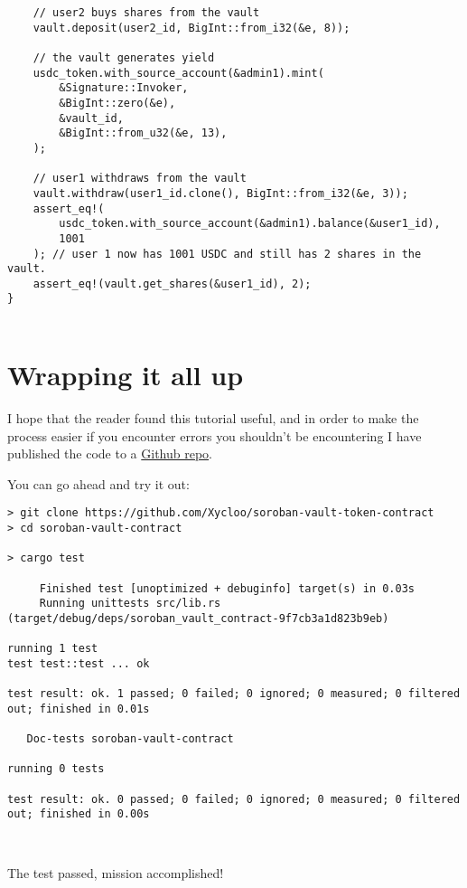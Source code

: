 \documentclass{article}
\begin{document}
\begin{lstlisting}
    // user2 buys shares from the vault
    vault.deposit(user2_id, BigInt::from_i32(&e, 8));

    // the vault generates yield
    usdc_token.with_source_account(&admin1).mint(
        &Signature::Invoker,
        &BigInt::zero(&e),
        &vault_id,
        &BigInt::from_u32(&e, 13),
    );

    // user1 withdraws from the vault
    vault.withdraw(user1_id.clone(), BigInt::from_i32(&e, 3));
    assert_eq!(
        usdc_token.with_source_account(&admin1).balance(&user1_id),
        1001
    ); // user 1 now has 1001 USDC and still has 2 shares in the vault.
    assert_eq!(vault.get_shares(&user1_id), 2);
}


\end{lstlisting}

\section{Wrapping it all up}
I hope that the reader found this tutorial useful, and in order to make the process easier if you encounter errors you shouldn't be encountering I have published the code to a \href{https://github.com/Xycloo/soroban-vault-contract}{Github repo}.

You can go ahead and try it out:

\begin{lstlisting}
> git clone https://github.com/Xycloo/soroban-vault-token-contract
> cd soroban-vault-contract

> cargo test

     Finished test [unoptimized + debuginfo] target(s) in 0.03s
     Running unittests src/lib.rs (target/debug/deps/soroban_vault_contract-9f7cb3a1d823b9eb)

running 1 test
test test::test ... ok

test result: ok. 1 passed; 0 failed; 0 ignored; 0 measured; 0 filtered out; finished in 0.01s

   Doc-tests soroban-vault-contract

running 0 tests

test result: ok. 0 passed; 0 failed; 0 ignored; 0 measured; 0 filtered out; finished in 0.00s

  
\end{lstlisting}



The test passed, mission accomplished!
\end{document}
